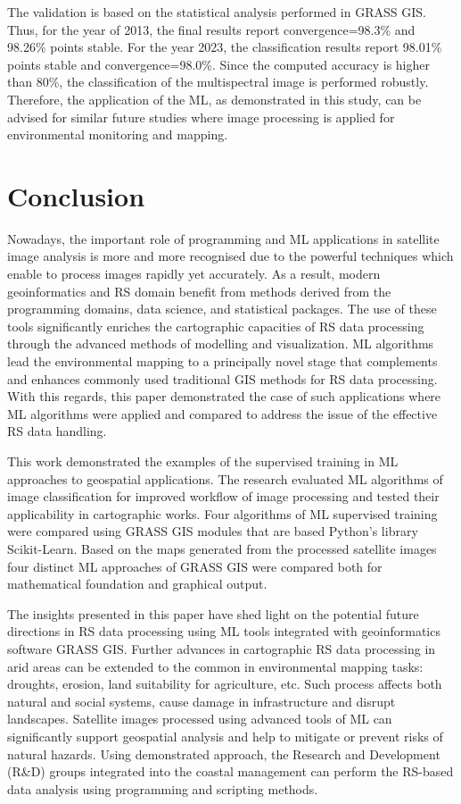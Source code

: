 \documentclass[final,5p,times,twocolumn]{elsarticle}
\numberwithin{table}{section}
\begin{document}
The validation is based on the statistical analysis performed in GRASS GIS. Thus, for the year of 2013, the final results report convergence=98.3\% and 98.26\% points stable. For the year 2023, the classification results report 98.01\% points stable and convergence=98.0\%. Since the computed accuracy is higher than 80\%, the classification of the multispectral image is performed robustly. Therefore, the application of the ML, as demonstrated in this study, can be advised for similar future studies where image processing is applied for environmental monitoring and mapping.

\section{Conclusion}

Nowadays, the important role of programming and ML applications in satellite image analysis is more and more recognised due to the powerful techniques which enable to process images rapidly yet accurately. As a result, modern geoinformatics and RS domain benefit from methods derived from the programming domains, data science, and statistical packages. The use of these tools significantly enriches the cartographic capacities of RS data processing through the advanced methods of modelling and visualization. ML algorithms lead the environmental mapping to a principally novel stage that complements and enhances commonly used traditional GIS methods for RS data processing. With this regards, this paper demonstrated the case of such applications where ML algorithms were applied and compared to address the issue of the effective RS data handling.

This work demonstrated the examples of the supervised training in ML approaches to geospatial applications. The research evaluated ML algorithms of image classification for improved workflow of image processing and tested their applicability in cartographic works. Four algorithms of ML supervised training were compared using GRASS GIS modules that are based Python's library Scikit-Learn. Based on the maps generated from the processed satellite images four distinct ML approaches of GRASS GIS were compared both for mathematical foundation and graphical output. 

The insights presented in this paper have shed light on the potential future directions in RS data processing using ML tools integrated with geoinformatics software GRASS GIS. Further advances in cartographic RS data processing in arid areas can be extended to the common in environmental mapping tasks:  droughts, erosion, land suitability for agriculture, etc. Such process affects both natural and social systems, cause damage in infrastructure and disrupt landscapes. Satellite images processed using advanced tools of ML can significantly support geospatial analysis and help to mitigate or prevent risks of natural hazards. Using demonstrated approach, the Research and Development (R\&D) groups integrated into the coastal management can perform the RS-based data analysis using programming and scripting methods.
\end{document}
